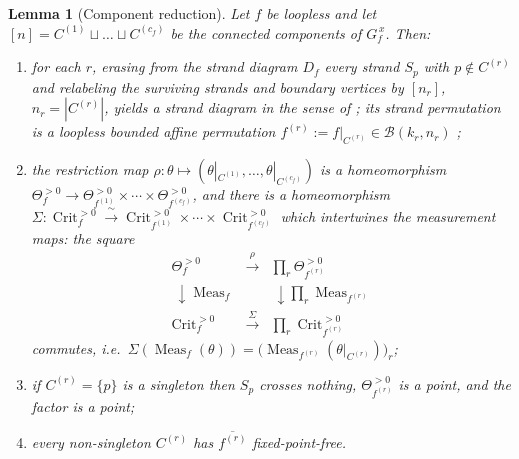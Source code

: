 \documentclass[11pt]{article}
\newtheorem{lemma}[theorem]{Lemma}
\theoremstyle{definition}
\DeclareMathOperator{\Meas}{Meas}
\DeclareMathOperator{\Crit}{Crit}
\newcommand{\Thef}{\Theta_f^{>0}}
\newcommand{\Critf}{\Crit_f^{>0}}
\begin{document}
\begin{lemma}[Component reduction]\label{lem:reduction}
Let $f$ be loopless and let $[n]=C^{(1)}\sqcup\dots\sqcup C^{(c_f)}$ be the connected components of
$G_f^{\,x}$. Then:
\begin{enumerate}
\item for each $r$, erasing from the strand diagram $D_f$ every strand $S_p$ with $p\notin C^{(r)}$ and
relabeling the surviving strands and boundary vertices by $[n_r]$, $n_r=|C^{(r)}|$, yields a strand diagram
in the sense of \cite[Def.~4.5]{Galashin}; its strand permutation is a loopless bounded affine permutation
$f^{(r)}:=f|_{C^{(r)}}\in\mathcal B(k_r,n_r)$ \textup{\cite[\S4.4]{Galashin}};
\item the restriction map $\rho:\theta\mapsto(\theta|_{C^{(1)}},\dots,\theta|_{C^{(c_f)}})$ is a
homeomorphism $\Thef\to\Theta_{f^{(1)}}^{>0}\times\cdots\times\Theta_{f^{(c_f)}}^{>0}$, and there is a
homeomorphism $\Sigma:\Critf\xrightarrow{\ \sim\ }
\Crit_{f^{(1)}}^{>0}\times\cdots\times\Crit_{f^{(c_f)}}^{>0}$
\textup{\cite[Prop.~4.10]{Galashin}} which \emph{intertwines the measurement maps}: the square
\begin{equation}\label{eq:reduction-square}
\begin{array}{ccc}
 \Thef & \xrightarrow{\ \rho\ } & \prod_r\Theta_{f^{(r)}}^{>0}\\[2pt]
 \ \downarrow{\scriptstyle\Meas_f} & &\ \downarrow{\scriptstyle\prod_r\Meas_{f^{(r)}}}\\[2pt]
 \Critf & \xrightarrow{\ \Sigma\ } & \prod_r\Crit_{f^{(r)}}^{>0}
\end{array}
\end{equation}
commutes, i.e.\ $\Sigma(\Meas_f(\theta))=\bigl(\Meas_{f^{(r)}}(\theta|_{C^{(r)}})\bigr)_r$;
\item if $C^{(r)}=\{p\}$ is a singleton then $S_p$ crosses nothing, $\Theta_{f^{(r)}}^{>0}$ is a point, and
the factor is a point;
\item every non-singleton $C^{(r)}$ has $\overline{f^{(r)}}$ fixed-point-free.
\end{enumerate}
\end{lemma}
\end{document}
